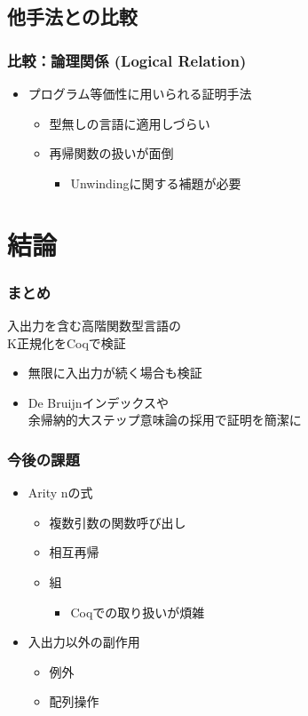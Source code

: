 \documentclass[t,dvipdfmx,cjk,xcolor=dvipsnames,envcountsect,notheorems,12pt]{beamer}
\theoremstyle{definition}
\begin{document}
\subsection{他手法との比較}

\begin{frame}
	\frametitle{比較：論理関係 (Logical Relation)}
	\begin{itemize}
		\item プログラム等価性に用いられる証明手法
		\begin{itemize}
			\item 型無しの言語に適用しづらい
			\item 再帰関数の扱いが面倒
				\begin{itemize}
					\item Unwindingに関する補題が必要
				\end{itemize}
		\end{itemize}
	\end{itemize}
\end{frame}

\section{結論}

\begin{frame}
	\frametitle{まとめ}
	\LARGE 入出力を含む高階関数型言語の\\
	K正規化をCoqで検証
	\begin{itemize}
		\item 無限に入出力が続く場合も検証
		\item De Bruijnインデックスや\\
			余帰納的大ステップ意味論の採用で証明を簡潔に
	\end{itemize}
\end{frame}

\begin{frame}
	\frametitle{今後の課題}
	\begin{itemize}
		\item Arity nの式
			\begin{itemize}
				\item 複数引数の関数呼び出し
				\item 相互再帰
				\item 組
					\begin{itemize}
						\item Coqでの取り扱いが煩雑
					\end{itemize}
			\end{itemize}
		\item 入出力以外の副作用
			\begin{itemize}
				\item 例外
				\item 配列操作
			\end{itemize}
	\end{itemize}
\end{frame}
\end{document}
